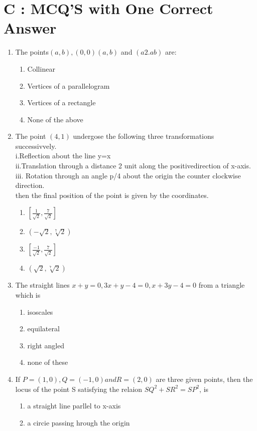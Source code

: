 \documentclass[12pt]{article}
\begin{document}
\section*{C  :   MCQ'S with One Correct Answer}
\begin{enumerate}

\item The points$(a,b),(0,0)(a,b)$ and $(a2.ab)$ are:
\begin{enumerate}
\item Collinear
\item Vertices of a parallelogram
\item Vertices of a rectangle
\item None of the above
\end{enumerate}
\item The point $(4,1)$ undergose the following three transformations successivvely.\\
i.Reflection about the line y=x\\
ii.Translation through a distance 2 unit along the positivedirection of x-axis.\\
iii. Rotation through an angle p/4 about the origin the counter clockwise direction.\\
then the final position of the point is given by the coordinates.
\begin{enumerate}
\item  $ [\frac{1}{\sqrt{2}},\frac{7}{\sqrt{2}}]$  
\item  $(-\sqrt{2}, \sqrt[7]{2})$  
\item  $[\frac{-1}{\sqrt{2}},\frac{7}{\sqrt{2}}]$
\item  $(\sqrt{2}, \sqrt[7]{2})$
\end{enumerate}
\item The straight lines $x+y=0, 3x+y-4=0,x+3y-4=0$ from a triangle which is 
\begin{enumerate}
\item isoscales 
\item equilateral
\item right angled  
\item  none of these 
\end{enumerate}
\item If $P=(1,0), Q=(-1,0) and R=(2,0)$ are three given
points, then  the locus  of the point S satisfying the relaion $SQ^2+SR^2=SP^2$, is
\begin{enumerate}
\item  a straight line parllel to x-axis  
\item  a circie passing hrough the origin 

\end{enumerate}
\end{enumerate}
\end{document}

